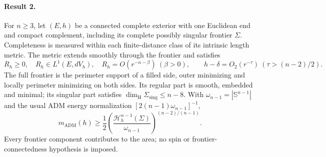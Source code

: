 \documentclass[11pt]{article}
\begin{document}
\paragraph{Result 2.} For $n\ge3$, let $(E,h)$ be a connected complete exterior with one Euclidean end and compact complement, including its complete possibly singular frontier $\Sigma$. Completeness is measured within each finite-distance class of its intrinsic length metric. The metric extends smoothly through the frontier and satisfies
\[
 R_h\ge0,\quad R_h\in L^1(E,dV_h),\quad R_h=O(r^{-n-\beta})\ (\beta>0),\qquad
 h-\delta=O_2(r^{-\tau})\ (\tau>(n-2)/2).
\]
The full frontier is the perimeter support of a filled side, outer minimizing and locally perimeter minimizing on both sides. Its regular part is smooth, embedded and minimal; its singular part satisfies $\dim_{\mathrm H}\Sigma_{\mathrm{sing}}\le n-8$. With $\omega_{n-1}=|\mathbb S^{n-1}|$ and the usual ADM energy normalization $[2(n-1)\omega_{n-1}]^{-1}$,
\[
 m_{\mathrm{ADM}}(h)\ge\frac12\left(\frac{\mathcal H_h^{n-1}(\Sigma)}{\omega_{n-1}}\right)^{(n-2)/(n-1)}.
\]
Every frontier component contributes to the area; no spin or frontier-connectedness hypothesis is imposed.
\end{document}
